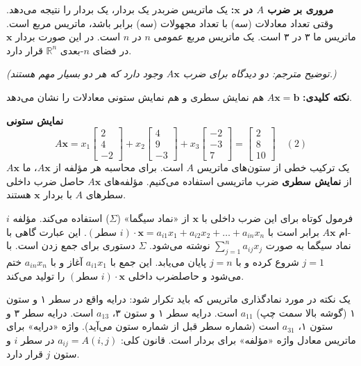 \documentclass[12pt, a4paper]{book}
\begin{document}
	\textbf{مروری بر ضرب $A$ در $\mathbf{x}$:} یک ماتریس ضربدر یک بردار، یک بردار را نتیجه می‌دهد. وقتی تعداد معادلات (سه) با تعداد مجهولات (سه) برابر باشد، ماتریس مربع است. ماتریس ما ۳ در ۳ است. یک ماتریس مربع عمومی $n$ در $n$ است. در این صورت بردار $\mathbf{x}$ در فضای $n$-بعدی $\mathbb{R}^n$ قرار دارد.
	
	\textit{(توضیح مترجم: دو دیدگاه برای ضرب $A\mathbf{x}$ وجود دارد که هر دو بسیار مهم هستند.)}
	
	\textbf{نکته کلیدی:} $A\mathbf{x}=\mathbf{b}$ هم نمایش سطری و هم نمایش ستونی معادلات را نشان می‌دهد.
	
	\textbf{نمایش ستونی}
	\[ A\mathbf{x} = x_1 \begin{bmatrix} 2 \\ 4 \\ -2 \end{bmatrix} + x_2 \begin{bmatrix} 4 \\ 9 \\ -3 \end{bmatrix} + x_3 \begin{bmatrix} -2 \\ -3 \\ 7 \end{bmatrix} = \begin{bmatrix} 2 \\ 8 \\ 10 \end{bmatrix} \quad (2) \]
	$A\mathbf{x}$ یک ترکیب خطی از ستون‌های ماتریس $A$ است. برای محاسبه هر مؤلفه از $A\mathbf{x}$، ما از \textbf{نمایش سطری} ضرب ماتریسی استفاده می‌کنیم. مؤلفه‌های $A\mathbf{x}$ حاصل ضرب داخلی سطرهای $A$ با بردار $\mathbf{x}$ هستند.
	
	فرمول کوتاه برای این ضرب داخلی با $\mathbf{x}$ از «نماد سیگما» ($\Sigma$) استفاده می‌کند.
	مؤلفه $i$-ام $A\mathbf{x}$ برابر است با $(\text{سطر } i) \cdot \mathbf{x} = a_{i1}x_1 + a_{i2}x_2 + \dots + a_{in}x_n$.
	این عبارت گاهی با نماد سیگما به صورت $\sum_{j=1}^{n} a_{ij}x_j$ نوشته می‌شود. $\Sigma$ دستوری برای جمع زدن است. با $j=1$ شروع کرده و با $j=n$ پایان می‌یابد. این جمع با $a_{i1}x_1$ آغاز و با $a_{in}x_n$ ختم می‌شود و حاصلضرب داخلی $(\text{سطر } i) \cdot \mathbf{x}$ را تولید می‌کند.
	
	یک نکته در مورد نمادگذاری ماتریس که باید تکرار شود: درایه واقع در سطر ۱ و ستون ۱ (گوشه بالا سمت چپ) $a_{11}$ است. درایه سطر ۱ و ستون ۳، $a_{13}$ است. درایه سطر ۳ و ستون ۱، $a_{31}$ است (شماره سطر قبل از شماره ستون می‌آید). واژه «درایه» برای ماتریس معادل واژه «مؤلفه» برای بردار است. قانون کلی: $a_{ij} = A(i,j)$ در سطر $i$ و ستون $j$ قرار دارد.
	
\end{document}
